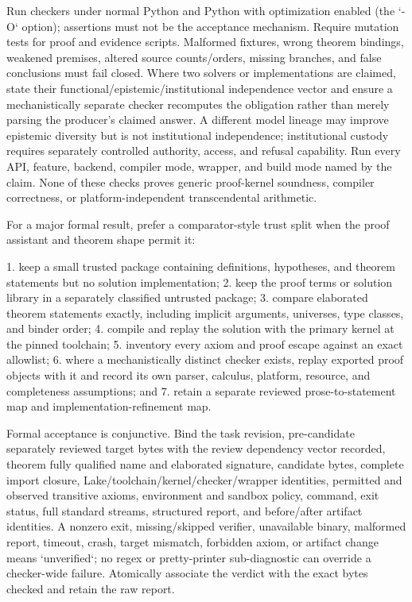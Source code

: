 \documentclass[11pt]{article}
\begin{document}
\begin{markdown}
Run checkers under normal Python and Python with optimization enabled (the `-O` option);
assertions must not be the acceptance mechanism. Require mutation tests for proof and evidence
scripts. Malformed fixtures, wrong theorem bindings, weakened premises, altered source
counts/orders, missing branches, and false conclusions must fail closed. Where two solvers or
implementations are claimed, state their
functional/epistemic/institutional independence vector and ensure a mechanistically separate
checker recomputes the obligation rather than merely parsing the producer's claimed answer. A
different model lineage may improve epistemic diversity but is not institutional independence;
institutional custody requires separately controlled authority, access, and refusal capability.
Run every API, feature, backend, compiler mode, wrapper, and build mode named by the claim. None of
these checks proves generic proof-kernel soundness, compiler correctness, or platform-independent
transcendental arithmetic.

For a major formal result, prefer a comparator-style trust split when the proof assistant and
theorem shape permit it:

1. keep a small trusted package containing definitions, hypotheses, and theorem statements but no
   solution implementation;
2. keep the proof terms or solution library in a separately classified untrusted package;
3. compare elaborated theorem statements exactly, including implicit arguments, universes, type
   classes, and binder order;
4. compile and replay the solution with the primary kernel at the pinned toolchain;
5. inventory every axiom and proof escape against an exact allowlist;
6. where a mechanistically distinct checker exists, replay exported proof objects with it and
   record its own parser, calculus, platform, resource, and completeness assumptions; and
7. retain a separate reviewed prose-to-statement map and implementation-refinement map.

Formal acceptance is conjunctive. Bind the task revision, pre-candidate separately reviewed target
bytes with the review dependency vector recorded, theorem fully qualified name and elaborated
signature, candidate bytes, complete import closure,
Lake/toolchain/kernel/checker/wrapper identities, permitted and observed transitive axioms,
environment and sandbox policy, command, exit status, full standard streams, structured report,
and before/after artifact identities. A nonzero exit, missing/skipped verifier, unavailable binary,
malformed report, timeout, crash, target mismatch, forbidden axiom, or artifact change means
`unverified`; no regex or pretty-printer sub-diagnostic can override a checker-wide failure.
Atomically associate the verdict with the exact bytes checked and retain the raw report.


\end{markdown}
\end{document}
